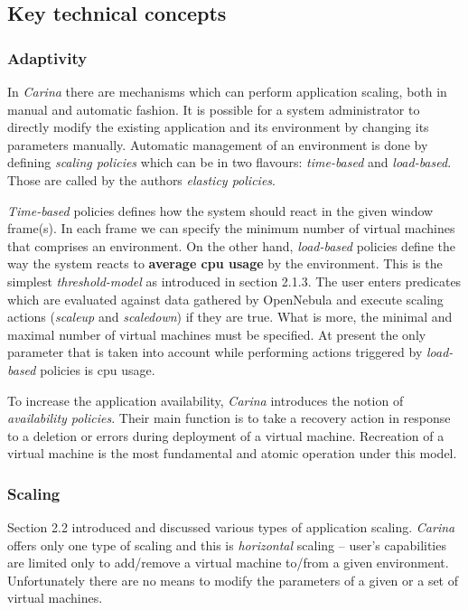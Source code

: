 \subsection{Key technical concepts}

\subsubsection{Adaptivity}
In \emph{Carina} there are mechanisms which can perform application scaling, both in manual and automatic fashion. It is possible for a system administrator to directly modify the existing application and its environment by changing its parameters manually. Automatic management of an environment is done by defining \emph{scaling policies} which can be in two flavours: \emph{time-based} and \emph{load-based}. Those are called by the authors \emph{elasticy policies}.

\emph{Time-based} policies defines how the system should react in the given window frame(s). In each frame we can specify the minimum number of virtual machines that comprises an environment. On the other hand, \emph{load-based} policies define the way the system reacts to \textbf{average cpu usage} by the environment. This is the simplest \emph{threshold-model} as introduced in section 2.1.3. The user enters predicates which are evaluated against data gathered by OpenNebula and execute scaling actions  (\emph{scaleup} and \emph{scaledown}) if they are true. What is more, the minimal and maximal number of virtual machines must be specified. At present the only parameter that is taken into account while performing actions triggered by \emph{load-based} policies is cpu usage.

To increase the application availability, \emph{Carina} introduces the notion of \emph{availability policies}. Their main function is to take a recovery action in response to a deletion or errors during deployment of a virtual machine. Recreation of a virtual machine is the most fundamental and atomic operation under this model.

\subsubsection{Scaling}
Section 2.2 introduced and discussed various types of application scaling. \emph{Carina} offers only one type of scaling and this is \emph{horizontal} scaling -- user's capabilities are limited only to add/remove a virtual machine to/from a given environment. Unfortunately there are no means to modify the parameters of a given or a set of virtual machines.

